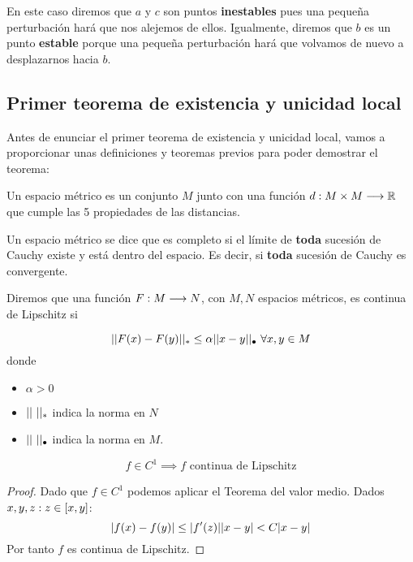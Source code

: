 \documentclass{mathnotes}
\begin{document}
En este caso diremos que $a$ y $c$ son puntos \textbf{inestables} pues una pequeña perturbación hará que nos alejemos de ellos. Igualmente, diremos que $b$ es un punto \textbf{estable} porque una pequeña perturbación hará que volvamos de nuevo a desplazarnos hacia $b$.


\subsection{Primer teorema de existencia y unicidad local}
Antes de enunciar el primer teorema de existencia y unicidad local, vamos a proporcionar unas definiciones y teoremas previos para poder demostrar el teorema:

\begin{definition}
Un espacio métrico es un conjunto $M$ junto con una función $d: M\times M \longrightarrow \mathbb{R}$ que cumple las 5 propiedades de las distancias.
\end{definition}

\begin{definition}
Un espacio métrico se dice que es completo si el límite de \textbf{toda} sucesión de Cauchy existe y está dentro del espacio. Es decir, si \textbf{toda} sucesión de Cauchy es convergente.
\end{definition}

\begin{definition}
Diremos que una función $F: M \longrightarrow N$, con $M, N$ espacios métricos, es continua de Lipschitz si

$$||F(x)-F(y)||_* \leq \alpha||x-y||_\bullet\ \forall x,y\in M$$ donde 
\begin{itemize}
\item $\alpha > 0$
\item $||\ ||_*$ indica la norma en $N$
\item $||\ ||_\bullet$ indica la norma en $M$.
\end{itemize}
\end{definition}

\begin{lemma}
$$f\in C^1 \implies f \text{ continua de Lipschitz}$$
\end{lemma}
\begin{proof}
Dado que $f\in C^1$ podemos aplicar el Teorema del valor medio. Dados $x,y,z : z\in[x,y]$:
$$|f(x) - f(y)| \leq |f^\prime(z)||x-y| < C|x-y|$$
Por tanto $f$ es continua de Lipschitz.
\end{proof}
\end{document}
